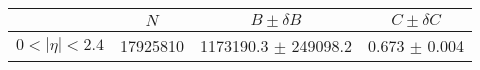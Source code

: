 \begin{tabular}{lccc}
\hline
    &   $N$   & $B \pm \delta B$  &  $C \pm \delta C$ \\
\hline
$0 < |\eta| <2.4$              & 17925810   & 1173190.3  $\pm$ 249098.2 & 0.673      $\pm$ 0.004 \\
\hline
\end{tabular}
